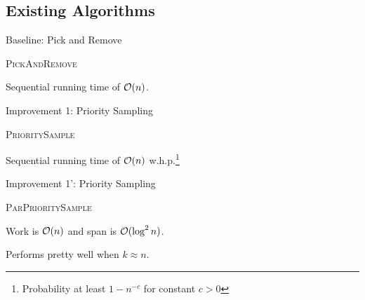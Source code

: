 \subsection{Existing Algorithms}

\begin{frame}{Baseline: Pick and Remove}
  \begin{algorithm}[H]
    \caption{\textsc{PickAndRemove}}
  \begin{algorithmic}
    \EndFor
  \end{algorithmic}
  \end{algorithm}

  Sequential running time of \(\mathcal{O}(n)\).
\end{frame}

\begin{frame}{Improvement 1: Priority Sampling}
  \begin{algorithm}[H]
    \caption{\textsc{PrioritySample}}
  \begin{algorithmic}

  \end{algorithmic}
  \end{algorithm}

  Sequential running time of \(\mathcal{O}(n)\) w.h.p.\footnote{Probability at least \(1 -
  n^{-c}\) for constant \(c > 0\)}
\end{frame}

\begin{frame}{Improvement 1': Priority Sampling}
  \begin{algorithm}[H]
    \caption{\textsc{ParPrioritySample}}
  \begin{algorithmic}

  \end{algorithmic}
  \end{algorithm}

  Work is \(\mathcal{O}(n)\) and span is \(\mathcal{O}(\log^2 n)\).

  Performs pretty well when \(k \approx n\).
\end{frame}

